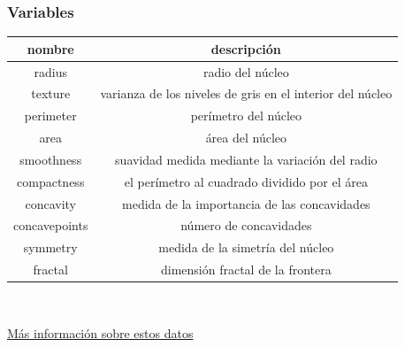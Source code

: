 \documentclass[dvipsnames, pdflatex,slidecentered]{beamer}
\begin{document}
\begin{frame}[plain]
\frametitle{Variables}

\begin{tabular}{|c|c|}
\hline
\textbf{nombre} & \textbf{descripción} \\ \hline
radius & radio del núcleo \\
texture & varianza de los niveles de gris en el interior del núcleo \\
perimeter & perímetro del núcleo\\
area & área del núcleo\\
smoothness & suavidad medida mediante la variación del radio\\
compactness & el perímetro al cuadrado dividido por el área\\
concavity & medida de la importancia de las concavidades \\
concavepoints & número de concavidades\\
symmetry & medida de la simetría del núcleo\\
fractal & dimensión fractal de la frontera \\ \hline
\end{tabular}

\

 \begin{center}
 \href{http://archive.ics.uci.edu/ml/}{Más información sobre estos datos}
 \end{center}

\end{frame}

\end{document}

